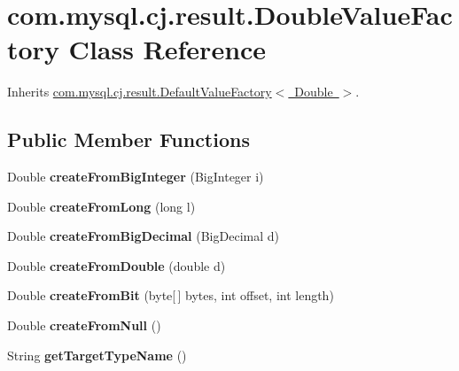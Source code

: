 \hypertarget{classcom_1_1mysql_1_1cj_1_1result_1_1_double_value_factory}{}\section{com.\+mysql.\+cj.\+result.\+Double\+Value\+Factory Class Reference}
\label{classcom_1_1mysql_1_1cj_1_1result_1_1_double_value_factory}


Inherits \mbox{\hyperlink{classcom_1_1mysql_1_1cj_1_1result_1_1_default_value_factory}{com.\+mysql.\+cj.\+result.\+Default\+Value\+Factory$<$ Double $>$}}.

\subsection*{Public Member Functions}
\begin{DoxyCompactItemize}
\item 
\mbox{\label{classcom_1_1mysql_1_1cj_1_1result_1_1_double_value_factory_a63041f6dad46ed82d1cf81dbe1d041be}} 
Double {\bfseries create\+From\+Big\+Integer} (Big\+Integer i)
\item 
\mbox{\label{classcom_1_1mysql_1_1cj_1_1result_1_1_double_value_factory_aadbf2f21bdf6bca3380d46e4f47780c1}} 
Double {\bfseries create\+From\+Long} (long l)
\item 
\mbox{\label{classcom_1_1mysql_1_1cj_1_1result_1_1_double_value_factory_a12fe2f8fe42275c891749991a20b4f11}} 
Double {\bfseries create\+From\+Big\+Decimal} (Big\+Decimal d)
\item 
\mbox{\label{classcom_1_1mysql_1_1cj_1_1result_1_1_double_value_factory_afdb0f1be1d40b15338a923714394deb2}} 
Double {\bfseries create\+From\+Double} (double d)
\item 
\mbox{\label{classcom_1_1mysql_1_1cj_1_1result_1_1_double_value_factory_a3ee4ad7f8d4b82b9c0bad399d5ef3a98}} 
Double {\bfseries create\+From\+Bit} (byte\mbox{[}$\,$\mbox{]} bytes, int offset, int length)
\item 
\mbox{\label{classcom_1_1mysql_1_1cj_1_1result_1_1_double_value_factory_abc9307df0c4777e40c08e1dd23191852}} 
Double {\bfseries create\+From\+Null} ()
\item 
\mbox{\label{classcom_1_1mysql_1_1cj_1_1result_1_1_double_value_factory_a976248bbfa84d98a793d29554ec03465}} 
String {\bfseries get\+Target\+Type\+Name} ()
\end{DoxyCompactItemize}



